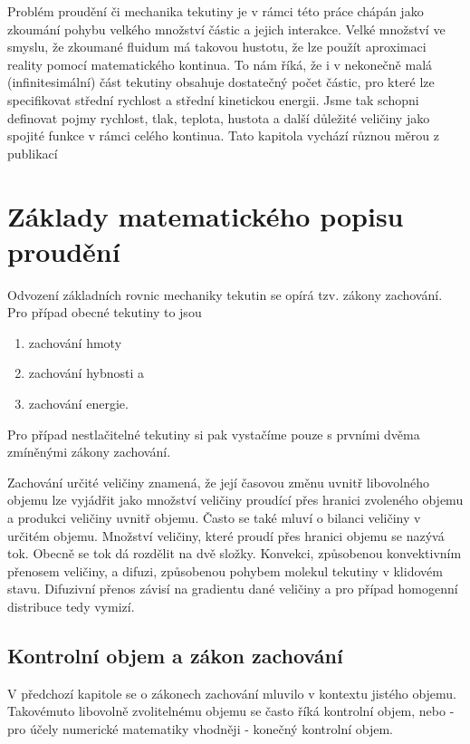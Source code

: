 
Problém proudění či mechanika tekutiny je v rámci této práce chápán jako zkoumání pohybu velkého množství částic a jejich interakce. Velké množství ve smyslu, že zkoumané fluidum má takovou hustotu, že lze použít aproximaci reality pomocí matematického kontinua. To nám říká, že i v nekonečně malá (infinitesimální) část tekutiny obsahuje dostatečný počet částic, pro které lze specifikovat střední rychlost a střední kinetickou energii. Jsme tak schopni definovat pojmy rychlost, tlak, teplota, hustota a další důležité veličiny jako spojité funkce v rámci celého kontinua. Tato kapitola vychází různou měrou z publikací \cite{blazek2015computational, dvorak1987vnitrniaerodynamika, hirsch2007numerical, shapiro1953dynamics, furst2020mko2}

\section{Základy matematického popisu proudění} \label{sec:zaklady_popisu}

Odvození základních rovnic mechaniky tekutin se opírá tzv. zákony zachování. Pro případ obecné tekutiny to jsou
\begin{enumerate}
	\item zachování hmoty
	\item zachování hybnosti a
	\item zachování energie.
\end{enumerate}
Pro případ nestlačitelné tekutiny si pak vystačíme pouze s prvními dvěma zmíněnými zákony zachování.

Zachování určité veličiny znamená, že její časovou změnu uvnitř libovolného objemu lze vyjádřit jako množství veličiny proudící přes hranici zvoleného objemu a produkci veličiny uvnitř objemu. Často se také mluví o bilanci veličiny v určitém objemu. Množství veličiny, které proudí přes hranici objemu se nazývá tok. Obecně se tok dá rozdělit na dvě složky. Konvekci, způsobenou konvektivním přenosem veličiny, a difuzi, způsobenou pohybem molekul tekutiny v klidovém stavu. Difuzivní přenos závisí na gradientu dané veličiny a pro případ homogenní distribuce tedy vymizí.

\subsection{Kontrolní objem a zákon zachování}\label{sec:kontrolni_objem}
V předchozí kapitole se o zákonech zachování mluvilo v kontextu jistého objemu. Takovémuto libovolně zvolitelnému objemu se často říká kontrolní objem, nebo - pro účely numerické matematiky vhodněji - konečný kontrolní objem.

